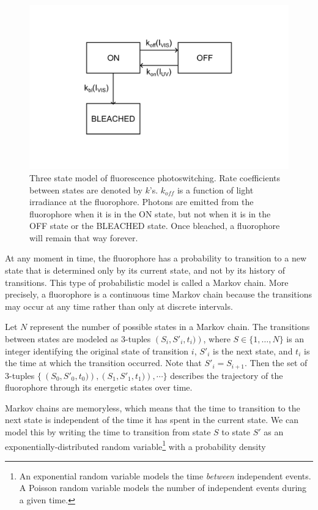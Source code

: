 \documentclass[10pt,a4paper,oneside]{book}
\begin{document}
\begin{figure}[ht]
    \centering
    \includegraphics{three-state-photoswitching-model.png}
    \caption{Three state model of fluorescence photoswitching. Rate coefficients between states are denoted by $k$'s. $k_{off}$ is a function of light irradiance at the fluorophore. Photons are emitted from the fluorophore when it is in the ON state, but not when it is in the OFF state or the BLEACHED state. Once bleached, a fluorophore will remain that way forever.}
    \label{fig:three-state-photoswitching}
\end{figure}

At any moment in time, the fluorophore has a probability to transition to a new state that is determined only by its current state, and not by its history of transitions. This type of probabilistic model is called a Markov chain. More precisely, a fluorophore is a continuous time Markov chain because the transitions may occur at any time rather than only at discrete intervals.

Let $N$ represent the number of possible states in a Markov chain. The transitions between states are modeled as 3-tuples $\left(S_{i}, S'_{i}, t_i)\right)$, where $S \in \{ 1, \ldots, N \} $ is an integer identifying the original state of transition $i$, $S'_{i}$ is the next state, and $t_i$ is the time at which the transition occurred. Note that $S'_{i} = S_{i + 1}$. Then the set of 3-tuples $\{\ \left(S_{0}, S'_{0}, t_0)\right), \left(S_{1}, S'_{1}, t_{1})\right), \cdots \}$ describes the trajectory of the fluorophore through its energetic states over time.

Markov chains are memoryless, which means that the time to transition to the next state is independent of the time it has spent in the current state. We can model this by writing the time to transition from state $S$ to state $S'$ as an exponentially-distributed random variable\footnote{An exponential random variable models the time \textit{between} independent events. A Poisson random variable models the number of independent events during a given time.} with a probability density
\end{document}
